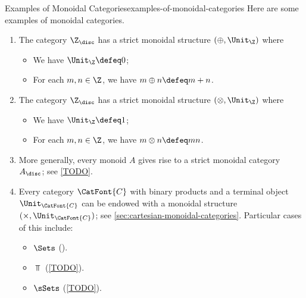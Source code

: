 \begin{example}{Examples of Monoidal Categories}{examples-of-monoidal-categories}%
    Here are some examples of monoidal categories.
    \begin{enumerate}
        \item\label{examples-of-monoidal-categories-the-integers-with-addition}The category $\Z_{\disc}$ has a strict monoidal structure $(\oplus,\Unit_{\Z})$ where
            \begin{itemize}
                \item We have $\Unit_{\Z}\defeq0$;
                \item For each $m,n\in\Z$, we have $m\oplus n\defeq m+n$.
            \end{itemize}
        \item\label{examples-of-monoidal-categories-the-integers-with-multiplication}The category $\Z_{\disc}$ has a strict monoidal structure $(\otimes,\Unit_{\Z})$ where
            \begin{itemize}
                \item We have $\Unit_{\Z}\defeq1$;
                \item For each $m,n\in\Z$, we have $m\otimes n\defeq mn$.
            \end{itemize}
        \item\label{examples-of-monoidal-categories-monoids}More generally, every monoid $A$ gives rise to a strict monoidal category $A_{\disc}$; see \cref{TODO}.
        \item\label{examples-of-monoidal-categories-cartesian-monoidal-categories}Every category $\CatFont{C}$ with binary products and a terminal object $\Unit_{\CatFont{C}}$ can be endowed with a monoidal structure $(\times,\Unit_{\CatFont{C}})$; see \cref{sec:cartesian-monoidal-categories}. Particular cases of this include:
            \begin{itemize}
                \item $\Sets$     ().
                \item $\Top$      (\cref{TODO}).
                \item $\sSets$    (\cref{TODO}).

\end{itemize}
\end{enumerate}
\end{example}
